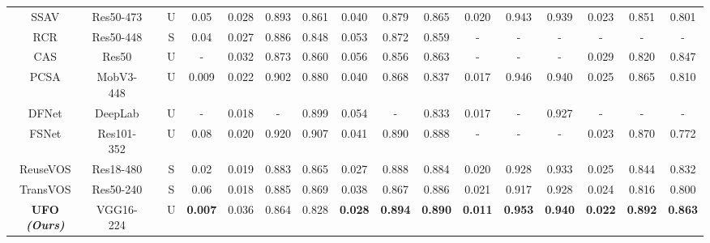 \documentclass[journal]{IEEEtran}
\begin{document}
\begin{table*}[t]
\begin{center}
{\begin{tabular}{c|c|c|c|c|ccc|ccc|ccc|ccc}
				SSAV\cite{fan2019shifting}\tiny{}& Res50-473 & \XSolidBrush& U & 0.05 & 0.028 & 0.893  & 0.861  & {0.040} & {0.879} & 0.865 & 0.020 & 0.943 & 0.939 & 0.023 & 0.851 & 0.801\\
				
				RCR\cite{yan2019semi}\tiny{}& Res50-448 & \ding{52} & S & 0.04 & 0.027 & 0.886 & 0.848  & 0.053 & 0.872  & 0.859 & - & -  & - & - & - & -\\
				




				CAS\cite{ji2020casnet}\tiny{}& Res50 & \XSolidBrush& U & - &  0.032 & 0.873 & 0.860  & 0.056 & 0.856 & 0.863 & - & -  & - & 0.029 & 0.820 & 0.847\\
				
				
				PCSA\cite{gu2020pyramid}\tiny{}& MobV3-448 & \XSolidBrush& U &{\color{blue}0.009} &  0.022 & 0.902 &  0.880  & 0.040 & 0.868  & 0.837 & 0.017 & 0.946 & {\color{blue}0.940} & 0.025 & 0.865 & 0.810\\
				
				DFNet\cite{zhen2020learning}\tiny{}& DeepLab & \XSolidBrush& U & - &  {\color{blue}0.018} & - & 0.899  & 0.054 & - & 0.833 & 0.017 & - & 0.927 & - & - & -\\
				
				FSNet\cite{ji2021full}\tiny{}& Res101-352 & \ding{52} & U & 0.08 & 0.020 & {\color{red}0.920}  & {\color{red}0.907}  & 0.041 & 0.890 & {\color{blue}0.888} & - & - & - & 0.023 & 0.870 & 0.772\\
				


				ReuseVOS\cite{park2021learning}\tiny{}& Res18-480 & \XSolidBrush & S & 0.02 & 0.019 & 0.883  & 0.865  & 0.027 & 0.888 & 0.884 & 0.020 & 0.928 & 0.933 & 0.025 & 0.844 & 0.832\\
				
				TransVOS\cite{mei2021transvos}\tiny{}& Res50-240 & \XSolidBrush & S & 0.06 & {\color{blue}0.018} & 0.885  & 0.869  & 0.038 & 0.867 & 0.886 & 0.021 & 0.917 & 0.928 & 0.024 & 0.816 & 0.800\\
					
				\midrule  \textbf{UFO \textit{(Ours)}} & VGG16-224 & \XSolidBrush& U & \textbf{{\color{red}0.007}} & 0.036 & 0.864  & 0.828 & \textbf{{\color{red}0.028}} & \textbf{{\color{red}0.894}} & \textbf{{\color{red}0.890}}  & \textbf{{\color{red}0.011}} & \textbf{{\color{blue}0.953}}  & \textbf{{\color{blue}0.940}} & \textbf{{\color{blue}0.022}} & \textbf{{\color{blue}0.892}} & \textbf{{\color{blue}0.863}}\\
			

\end{tabular}}
\end{center}
\end{table*}
\end{document}
